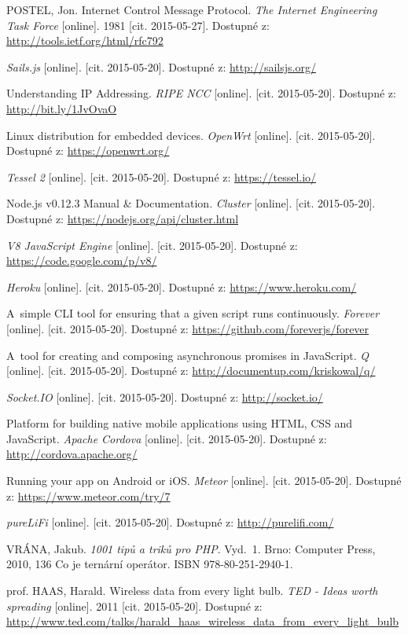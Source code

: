 \documentclass[oneside,12pt,a4paper,draft]{book} %
\begin{document}
\begin{thebibliography}{99}
POSTEL, Jon. Internet Control Message Protocol. \textit{The Internet Engineering Task Force} [online]. 1981 [cit. 2015-05-27]. Dostupné z: \url{http://tools.ietf.org/html/rfc792}

\textit{Sails.js} [online]. [cit. 2015-05-20]. Dostupné z: \url{http://sailsjs.org/}

Understanding IP Addressing. \textit{RIPE NCC} [online]. [cit. 2015-05-20]. Dostupné z: \url{http://bit.ly/1JvOvaO}

Linux distribution for embedded devices. \textit{OpenWrt} [online]. [cit. 2015-05-20]. Dostupné z: \url{https://openwrt.org/}

\textit{Tessel 2} [online]. [cit. 2015-05-20]. Dostupné z: \url{https://tessel.io/}

Node.js v0.12.3 Manual \& Documentation. \textit{Cluster} [online]. [cit. 2015-05-20]. Dostupné z: \url{https://nodejs.org/api/cluster.html}

\textit{V8 JavaScript Engine} [online]. [cit. 2015-05-20]. Dostupné z: \url{https://code.google.com/p/v8/}

\textit{Heroku} [online]. [cit. 2015-05-20]. Dostupné z: \url{https://www.heroku.com/}

A~simple CLI tool for ensuring that a given script runs continuously. \textit{Forever} [online]. [cit. 2015-05-20]. Dostupné z: \url{https://github.com/foreverjs/forever}

A~tool for creating and composing asynchronous promises in JavaScript. \textit{Q} [online]. [cit. 2015-05-20]. Dostupné z: \url{http://documentup.com/kriskowal/q/}

\textit{Socket.IO} [online]. [cit. 2015-05-20]. Dostupné z: \url{http://socket.io/}

Platform for building native mobile applications using HTML, CSS and JavaScript. \textit{Apache Cordova} [online]. [cit. 2015-05-20]. Dostupné z: \url{http://cordova.apache.org/}

Running your app on Android or iOS. \textit{Meteor} [online]. [cit. 2015-05-20]. Dostupné z: \url{https://www.meteor.com/try/7}

\textit{pureLiFi} [online]. [cit. 2015-05-20]. Dostupné z: \url{http://purelifi.com/}

VRÁNA, Jakub. \textit{1001 tipů a triků pro PHP}. Vyd.~1. Brno: Computer Press, 2010, 136 Co je ternární operátor. ISBN 978-80-251-2940-1.

prof. HAAS, Harald. Wireless data from every light bulb. \textit{TED - Ideas worth spreading} [online]. 2011 [cit. 2015-05-20]. Dostupné z: \url{http://www.ted.com/talks/harald_haas_wireless_data_from_every_light_bulb}

\end{thebibliography}

\printindex
\end{document}

